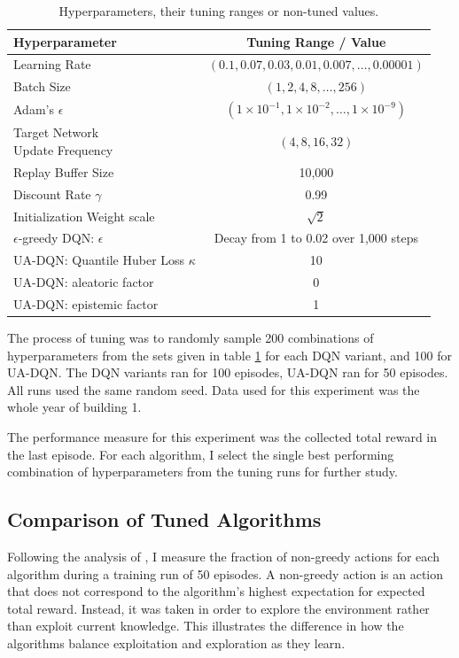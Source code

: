\begin{table}
    \centering
    \caption{Hyperparameters, their tuning ranges or non-tuned values.}
    \label{tab:tuning}
    \begin{tabular}{l|c}
        Hyperparameter & Tuning Range / Value \\ \hline
        Learning Rate  & $(0.1, 0.07, 0.03, 0.01, 0.007,\dots, 0.00001)$\\
        Batch Size     & $(1,2,4,8,\dots ,256)$                             \\
        Adam's $\epsilon$ & $(1\times 10^{-1}, 1\times 10^{-2}, \dots, 1\times 10^{-9})$ \\
        \makecell[l]{Target Network \\ Update Frequency} & $(4, 8, 16, 32)$ \\ \hline
        Replay Buffer Size & 10,000 \\
        Discount Rate $\gamma$ & 0.99 \\
        Initialization Weight scale & $\sqrt{2}$ \\
        $\epsilon$-greedy DQN: $\epsilon$ & Decay from 1 to 0.02 over 1,000 steps \\
        UA-DQN: Quantile Huber Loss $\kappa$ & 10 \\
        UA-DQN: aleatoric factor & 0 \\
        UA-DQN: epistemic factor & 1 \\
    \end{tabular}
\end{table}

The process of tuning was to randomly sample 200 combinations of hyperparameters from the sets given in table \ref{tab:tuning} for each DQN variant, and 100 for UA-DQN.
The DQN variants ran for 100 episodes, UA-DQN ran for 50 episodes.
All runs used the same random seed.
Data used for this experiment was the whole year of building 1.

The performance measure for this experiment was the collected total reward in the last episode.
For each algorithm, I select the single best performing combination of hyperparameters from the tuning runs for further study.

\subsection{Comparison of Tuned Algorithms}
Following the analysis of \cite{clements2020EstimatingRiskUncertainty}, I measure the fraction of non-greedy actions for each algorithm during a training run of 50 episodes.
A non-greedy action is an action that does not correspond to the algorithm's highest expectation for expected total reward. Instead, it was taken in order to explore the environment rather than exploit current knowledge.
This illustrates the difference in how the algorithms balance exploitation and exploration as they learn.

